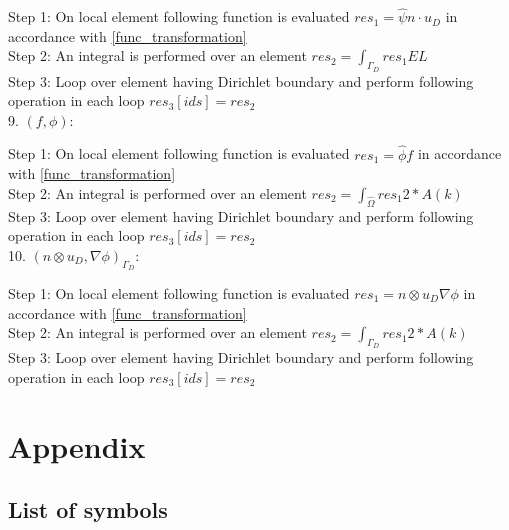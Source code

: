 \documentclass[a4paper,10pt]{book}
\begin{document}
Step 1: On local element following function is evaluated $res_1=\hat{\psi} n\cdot u_D$ in accordance with \ref{func_transformation}\\
Step 2: An integral is performed over an element $res_2=\int_{\Gamma_D} res_1 EL $\\
Step 3: Loop over element having Dirichlet boundary and perform following operation in each loop $res_3[ids]=res_2$\\

9. $(f,\phi) $:

Step 1: On local element following function is evaluated $res_1= \hat{\phi} f$ in accordance with \ref{func_transformation}\\
Step 2: An integral is performed over an element $res_2=\int_{\hat{\Omega}} res_1 2*A(k)$\\
Step 3: Loop over element having Dirichlet boundary and perform following operation in each loop $res_3[ids]=res_2$\\


10. $(n \otimes u_D,\nabla \phi)_{\Gamma_D} $:

Step 1: On local element following function is evaluated $res_1= n \otimes u_D  \nabla \phi$ in accordance with \ref{func_transformation}\\
Step 2: An integral is performed over an element $res_2=\int_{\Gamma_D} res_1 2*A(k)$\\
Step 3: Loop over element having Dirichlet boundary and perform following operation in each loop $res_3[ids]=res_2$\\

\newpage

\chapter{Appendix}

\section{List of symbols}
\end{document}
